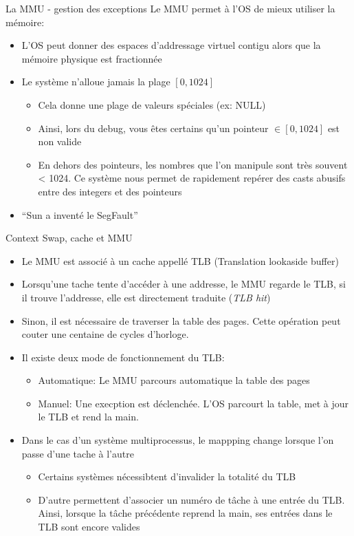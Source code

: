 \begin{frame}{La MMU - gestion des exceptions}
  Le MMU permet à l'OS de mieux utiliser la mémoire:
  \begin{itemize}
  \item  L'OS peut  donner  des espaces  d'addressage virtuel  contigu
    alors que la mémoire physique est fractionnée
  \item Le système n'alloue jamais la plage $[0, 1024]$
    \begin{itemize}
    \item Cela donne une plage de valeurs spéciales (ex: NULL)
    \item Ainsi, lors du debug, vous êtes certains qu'un pointeur $\in
      [0, 1024]$ est non valide
    \item En dehors des pointeurs,  les nombres que l'on manipule sont
      très  souvent <  1024.   Ce système  nous  permet de  rapidement
      repérer des casts abusifs entre des integers et des pointeurs
    \end{itemize}
  \item ``Sun a inventé le SegFault''
  \end{itemize}
\end{frame}

\begin{frame}[fragile=singleslide]{Context Swap, cache et MMU}
  \begin{itemize}
  \item  Le  MMU est  associé  à  un  cache appellé  TLB  (Translation
    lookaside buffer)
  \item  Lorsqu'une  tache tente  d'accéder  à  une  addresse, le  MMU
    regarde  le TLB,  si il  trouve l'addresse,  elle  est directement
    traduite (\emph{TLB hit})
  \item  Sinon,   il  est  nécessaire   de  traverser  la   table  des
    pages.  Cette  opération  peut   couter  une  centaine  de  cycles
    d'horloge.
  \item Il existe deux mode de fonctionnement du TLB:
    \begin{itemize}
    \item Automatique: Le MMU parcours automatique la table des pages
    \item  Manuel: Une  execption  est déclenchée.   L'OS parcourt  la
      table, met à jour le TLB et rend la main.
    \end{itemize}
  \item Dans  le cas d'un  système multiprocessus, le  mappping change
    lorsque l'on passe d'une tache à l'autre
    \begin{itemize}
    \item  Certains systèmes nécessibtent  d'invalider la  totalité du
      TLB
    \item  D'autre permettent  d'associer  un numéro  de  tâche à  une
      entrée  du TLB. Ainsi,  lorsque la  tâche précédente  reprend la
      main, ses entrées dans le TLB sont encore valides
    \end{itemize}
  \end{itemize}
\end{frame}

